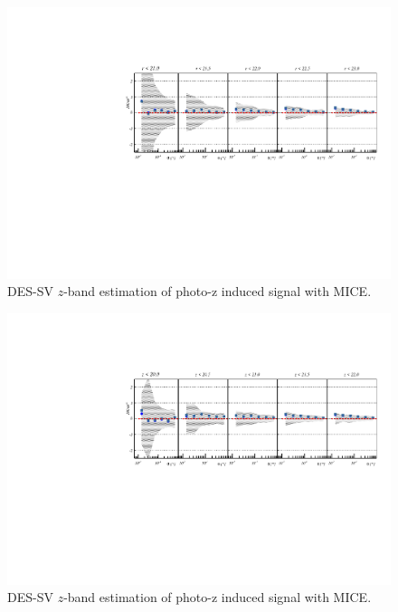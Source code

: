 \begin{figure}
\includegraphics[width=\textwidth,trim={0 2.3cm 0 3.5cm},clip]{./figures_appendix/mag_r_mix.pdf}
\caption{DES-SV $z$-band estimation of photo-z induced signal with MICE.}
\end{figure}

\begin{figure}
\includegraphics[width=\textwidth,trim={0 2.3cm 0 3.5cm},clip]{./figures_appendix/mag_z_mix.pdf}
\caption{DES-SV $z$-band estimation of photo-z induced signal with MICE.}
\end{figure}


